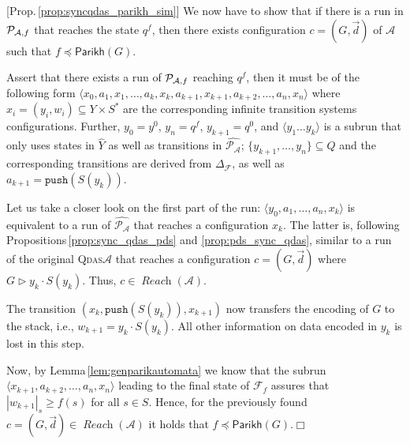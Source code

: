 \documentclass[runningheads,oribibl,]{article}
\newcommand{\mleq}{\preceq}
\newcommand{\Aa}{\ensuremath{\mathcal{A}}\xspace}
\newcommand{\Ff}{\ensuremath{\mathcal{F}}\xspace}
\newcommand{\Pp}{\ensuremath{\mathcal{P}}\xspace}
\newcommand{\cfont}[1]{\ensuremath{\mathtt{#1}}\xspace}
\newcommand{\qdas}{\textsc{Qdas}\xspace}
\DeclareMathOperator{\Reach}{\textit{Reach}}
\newcommand{\Graph}{\ensuremath{G}}
\newcommand{\Data}{\ensuremath{\vec{d}}}
\newcommand{\Parikh}{\ensuremath{\mathsf{Parikh}}}
\newcommand{\push}{\ensuremath{\cfont{push}}}
\newenvironment{proof}{\noindent{\it Proof.\hspace*{.5cm}}}{}
\newcommand{\qed}{\hfill$\Box$}
\begin{document}
\begin{proof}[Prop.\,\ref{prop:syncqdas_parikh_sim}]
  We now have to show that if there is a run in $\Pp_\Aaf$ that reaches
  the state $q^f$, then there exists configuration $c=(\Graph,\Data)$ of
  $\Aa$ such that $f\mleq\Parikh(G)$.

  Assert that there exists a run of $\Pp_\Aaf$ reaching $q^f$, then
  it must be of the following form
  $\langle x_0, a_1, x_1, \dots, a_k,
  x_k, a_{k+1}, x_{k+1}, a_{k+2},\dots, a_n, x_n\rangle$
  where $x_i=(y_i,w_i)\subseteq Y\times S^*$ are the corresponding infinite
  transition systems configurations.
  Further, $y_0=y^0$, $y_n=q^f$, $y_{k+1}=q^0$, and $\langle y_1\dots
  y_k\rangle$ is a
  subrun that only uses states in $\widehat{Y}$ as well as transitions in
  $\widehat{\Pp_\Aa}$; $\{y_{k+1},\dots,y_{n}\}\subseteq Q$ and the corresponding
  transitions are derived from $\Delta_\Ff$, as well as $a_{k+1}=\push(S(y_k))$.

  Let us take a closer look on the first part of the run:
  $\langle y_0, a_1,\dots, a_n, x_k\rangle$ is equivalent to a run of
  $\widehat{\Pp_\Aa}$ that reaches a configuration $x_k$. The latter is,
  following Propositions\,\ref{prop:sync_qdas_pds} and \ref{prop:pds_sync_qdas}, similar to a run of the
  original \qdas $\Aa$ that reaches a configuration $c=(\Graph,\Data)$ where
  $\Graph\triangleright y_k\cdot S(y_k)$. Thus, $c\in\Reach(\Aa)$.

  The transition $(x_k, \push(S(y_k)), x_{k+1})$ now transfers the
  encoding of $\Graph$ to the stack, i.e., $w_{k+1}=y_k\cdot S(y_k)$.
  All other information on data encoded in $y_k$ is lost in this step.

  Now, by Lemma\,\ref{lem:genparikautomata} we know that the subrun
  $\langle x_{k+1}, a_{k+2}, \dots, a_n, x_n\rangle$ leading to the final
  state of $\Ff_f$ assures that
  $|w_{k+1}|_s\geq f(s)$ for all  $s\in S$. Hence, for the previously found
   $c=(\Graph,\Data)\in\Reach(\Aa)$ it holds that $f\mleq\Parikh(G)$.\qed
\end{proof}
\end{document}
